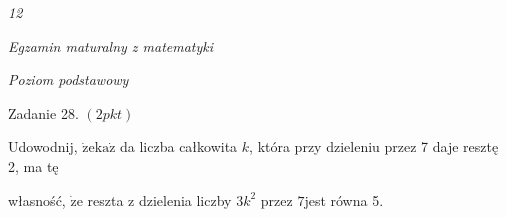 \documentclass[a4paper,12pt]{article}
\begin{document}
{\it 12}

{\it Egzamin maturalny z matematyki}

{\it Poziom podstawowy}

Zadanie 28. $(2pkt)$

Udowodnij, $\dot{\mathrm{z}}\mathrm{e}\mathrm{k}\mathrm{a}\dot{\mathrm{z}}$ da liczba całkowita $k$, która przy dzieleniu przez 7 daje resztę 2, ma tę

własność, $\dot{\mathrm{z}}\mathrm{e}$ reszta z dzielenia liczby $3k^{2}$ przez $7$jest równa 5.
\end{document}
